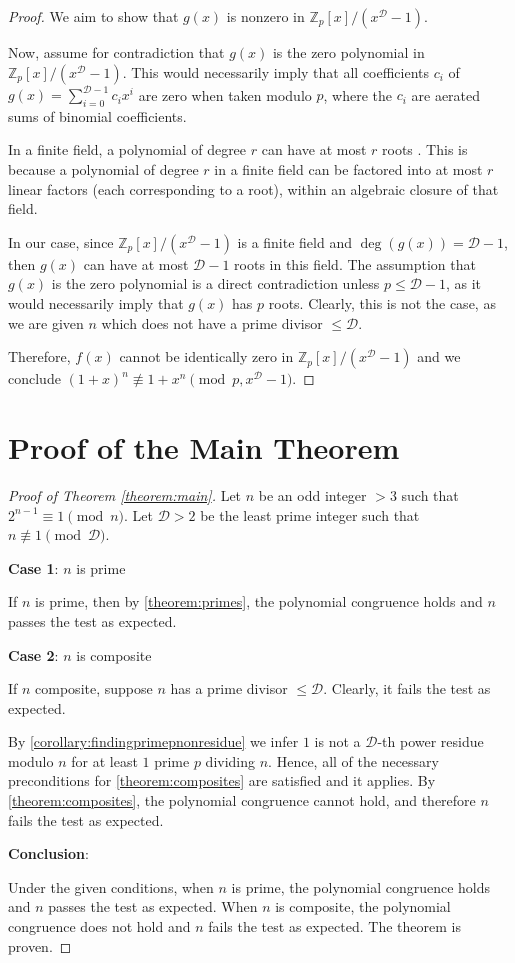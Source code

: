 \documentclass{article}
\theoremstyle{plain}
\theoremstyle{definition}
\newcommand{\D}{\mathcal{D}}
\begin{document}
\begin{proof}
We aim to show that $g(x)$ is nonzero in $\mathbb{Z}_p[x]/(x^{\D} - 1)$.

Now, assume for contradiction that $g(x)$ is the zero polynomial in $\mathbb{Z}_p[x]/(x^{\D} - 1)$. This would necessarily imply that all coefficients $c_i$ of $g(x) = \sum_{i=0}^{\D-1} c_i x^i$ are zero when taken modulo $p$, where the $c_i$ are aerated sums of binomial coefficients.

In a finite field, a polynomial of degree $r$ can have at most $r$ roots \cite{dummit2004abstractalgebra}. This is because a polynomial of degree $r$ in a finite field can be factored into at most $r$ linear factors (each corresponding to a root), within an algebraic closure of that field.

In our case, since $\mathbb{Z}_p[x]/(x^{\D} - 1)$ is a finite field and $\deg(g(x)) = \D-1$, then $g(x)$ can have at most $\D-1$ roots in this field. The assumption that $g(x)$ is the zero polynomial is a direct contradiction unless $p \leq \D-1$, as it would necessarily imply that $g(x)$ has $p$ roots. Clearly, this is not the case, as we are given $n$ which does not have a prime divisor $\leq \D$.

Therefore, $f(x)$ cannot be identically zero in $\mathbb{Z}_p[x]/(x^\D - 1)$ and we conclude $(1 + x)^n \not\equiv 1 + x^n \pmod{p, x^\D - 1}$.
\end{proof}

\section{Proof of the Main Theorem}
\begin{proof}[Proof of Theorem \ref{theorem:main}]
Let $n$ be an odd integer $>3$ such that $2^{n-1} \equiv 1 \pmod{n}$. Let $\D > 2$ be the least prime integer such that $n \not\equiv 1 \pmod{\D}$.

\textbf{Case 1}: $n$ is prime

If $n$ is prime, then by \cref{theorem:primes}, the polynomial congruence holds and $n$ passes the test as expected.

\textbf{Case 2}: $n$ is composite

If $n$ composite, suppose $n$ has a prime divisor $\leq \D$. Clearly, it fails the test as expected.

By \cref{corollary:findingprimepnonresidue} we infer $1$ is not a $\D$-th power residue modulo $n$ for at least $1$ prime $p$ dividing $n$. Hence, all of the necessary preconditions for \cref{theorem:composites} are satisfied and it applies. By \cref{theorem:composites}, the polynomial congruence cannot hold, and therefore $n$ fails the test as expected.

\textbf{Conclusion}:

Under the given conditions, when $n$ is prime, the polynomial congruence holds and $n$ passes the test as expected. When $n$ is composite, the polynomial congruence does not hold and $n$ fails the test as expected. The theorem is proven.
\end{proof}
\end{document}
